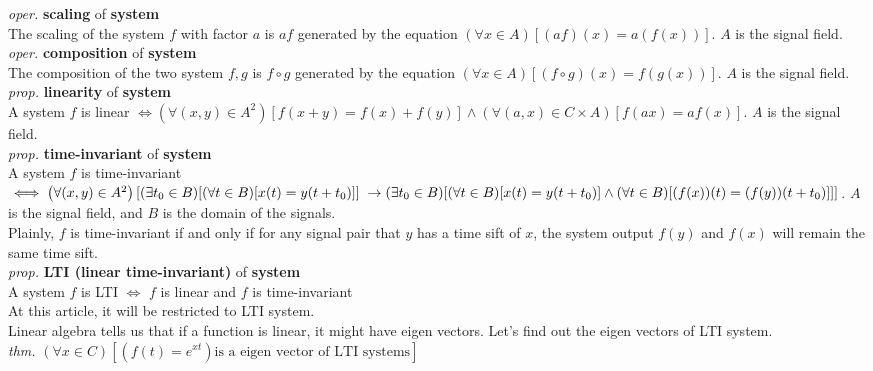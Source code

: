 \documentclass{article}
\newcommand{\sd}[1]{{\left(#1\right)}}
\newcommand{\thm}[1]{\emph{thm.} #1}
\newcommand{\md}[1]{{\left[#1\right]}}
\newcommand{\oper}[2]{\emph{oper.} \textbf{#1} of \textbf{#2}}
\newcommand{\prop}[2]{\emph{prop.} \textbf{#1} of \textbf{#2}}
\begin{document}
\oper{scaling}{system}\\
The scaling of the system $f$ with factor $a$ is $af$ generated by the equation $\sd{\forall x \in A}\md{\sd{af}\sd{x} = a\sd{f\sd{x}}}$. $A$ is the signal field.\\
\oper{composition}{system}\\
The composition of the two system $f,g$ is $f\circ g$ generated by the equation $\sd{\forall x \in A}\md{\sd{f\circ g}\sd{x} = f\sd{g\sd{x}}}$. $A$ is the signal field.\\
\prop{linearity}{system}\\
A system $f$ is linear $\iff \sd{\forall \sd{x,y} \in A^2}\md{f\sd{x+y} = f\sd{x}+f\sd{y}}\land\sd{\forall \sd{a,x} \in C\times A}\md{f\sd{ax} = af\sd{x}}$. $A$ is the signal field.\\
\prop{time-invariant}{system}\\
A system $f$ is time-invariant \\
\begin{math}\iff \sd{\forall \sd{x,y} \in A^2}\left[\sd{\exists t_0 \in B}\md{\sd{\forall t \in B}\md{x\sd{t} = y\sd{t+t_0}}} \right.\\ \left. \to \sd{\exists t_0 \in B}\md{\sd{\forall t \in B}\md{x\sd{t} = y\sd{t+t_0}}\land\sd{\forall t \in B}\md{\sd{f\sd{x}}\sd{t} = \sd{f\sd{y}}\sd{t+t_0}}}\right]\end{math}.
$A$ is the signal field, and $B$ is the domain of the signals.\\
Plainly, $f$ is time-invariant if and only if for any signal pair that $y$ has a time sift of $x$, the system output $f\sd{y}$ and $f\sd{x}$ will remain the same time sift.\\
\prop{LTI (linear time-invariant)}{system}\\
A system $f$ is LTI $\iff$ $f$ is linear and $f$ is time-invariant\\
At this article, it will be restricted to LTI system.\\
Linear algebra tells us that if a function is linear, it might have eigen vectors. Let's find out the eigen vectors of LTI system.\\
\thm{$\sd{\forall x \in C}\md{\sd{f\sd{t} = e^{xt}}\text{is a eigen vector of LTI systems}}$}\\
\end{document}
